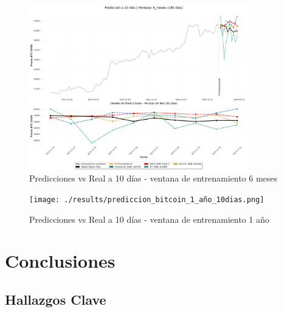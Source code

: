 \documentclass[12pt]{article}
\begin{document}
\begin{figure}[H]
\centering
\includegraphics[width=0.85\textwidth]{./results/prediccion_bitcoin_6_meses_10dias.png} 
\caption{Predicciones vs Real a 10 días - ventana de entrenamiento 6 meses}
\label{prediccion_seis_meses}
\end{figure}

\begin{figure}[H]
\centering
\texttt{[image: ./results/prediccion\_bitcoin\_1\_año\_10dias.png]}
\caption{Predicciones vs Real a 10 días - ventana de entrenamiento 1 año}
\label{prediccion_un_anio}
\end{figure}




\newpage
\section{Conclusiones}
\label{sec:conclusiones}

\subsection{Hallazgos Clave}
\end{document}

